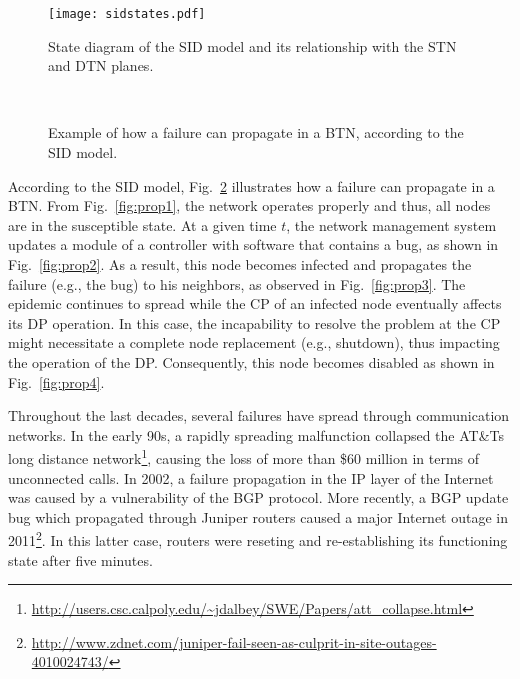 \documentclass[10pt,draftclsnofoot,onecolumn,journal]{IEEEtran}
\begin{document}
\begin{figure}
\centering
\texttt{[image: sidstates.pdf]}
\caption{State diagram of the SID model and its relationship with the STN and DTN planes.}
\label{fig:sid}
\end{figure}

\begin{figure}
 \centering
\\
  \caption{Example of how a failure can propagate in a BTN, according to the SID model.}
  \label{fig:failurepropagation}
\end{figure}

According to the SID model, Fig.~\ref{fig:failurepropagation} illustrates how a failure can propagate in a BTN. From Fig.~\ref{fig:prop1}, the network operates properly and thus, all nodes are in the susceptible state. At a given time $t$, the network management system updates a module of a controller with software that contains a bug, as shown in Fig.~\ref{fig:prop2}. As a result, this node becomes infected and propagates the failure (e.g., the bug) to his neighbors, as observed in Fig.~\ref{fig:prop3}. The epidemic continues to spread while the CP of an infected node eventually affects its DP operation. In this case, the incapability to resolve the problem at the CP might necessitate a complete node replacement (e.g., shutdown), thus impacting the operation of the DP. Consequently, this node becomes disabled as shown in Fig.~\ref{fig:prop4}.

Throughout the last decades, several failures have spread through communication networks. In the early 90s, a rapidly spreading malfunction collapsed the AT\&Ts long distance network\footnote{\url{http://users.csc.calpoly.edu/~jdalbey/SWE/Papers/att_collapse.html}}, causing the loss of more than \$60 million in terms of unconnected calls. In 2002, a failure propagation in the IP layer of the Internet was caused by a vulnerability of the BGP protocol. More recently, a BGP update bug which propagated through Juniper routers caused a major Internet outage in 2011\footnote{\url{http://www.zdnet.com/juniper-fail-seen-as-culprit-in-site-outages-4010024743/}}. In this latter case, routers were reseting and re-establishing its functioning state after five minutes.
\end{document}
